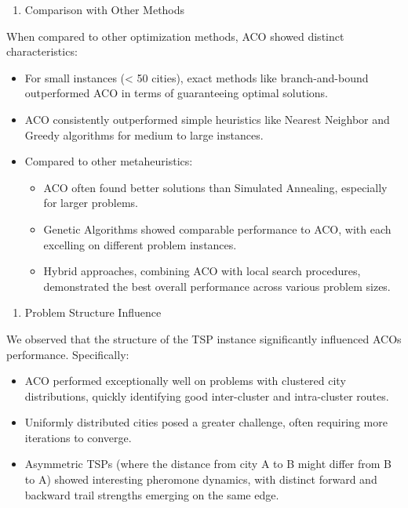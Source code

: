 \documentclass[
]{article}
\begin{document}
\begin{enumerate}
\def\labelenumi{\arabic{enumi}.}
\setcounter{enumi}{3}
\item
  Comparison with Other Methods
\end{enumerate}

When compared to other optimization methods, ACO showed distinct
characteristics:

\begin{itemize}
\item
  For small instances (\textless{} 50 cities), exact methods like
  branch-and-bound outperformed ACO in terms of guaranteeing optimal
  solutions.
\item
  ACO consistently outperformed simple heuristics like Nearest Neighbor
  and Greedy algorithms for medium to large instances.
\item
  Compared to other metaheuristics:

  \begin{itemize}
  \item
    ACO often found better solutions than Simulated Annealing,
    especially for larger problems.
  \item
    Genetic Algorithms showed comparable performance to ACO, with each
    excelling on different problem instances.
  \item
    Hybrid approaches, combining ACO with local search procedures,
    demonstrated the best overall performance across various problem
    sizes.
  \end{itemize}
\end{itemize}

\begin{enumerate}
\def\labelenumi{\arabic{enumi}.}
\setcounter{enumi}{4}
\item
  Problem Structure Influence
\end{enumerate}

We observed that the structure of the TSP instance significantly
influenced ACO\textquotesingle s performance. Specifically:

\begin{itemize}
\item
  ACO performed exceptionally well on problems with clustered city
  distributions, quickly identifying good inter-cluster and
  intra-cluster routes.
\item
  Uniformly distributed cities posed a greater challenge, often
  requiring more iterations to converge.
\item
  Asymmetric TSPs (where the distance from city A to B might differ from
  B to A) showed interesting pheromone dynamics, with distinct forward
  and backward trail strengths emerging on the same edge.
\end{itemize}
\end{document}
